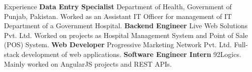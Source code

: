 \begin{rubric}{Experience}
\entry*[2017.10 -- 2018.08]%
	\textbf{Data Entry Specialist} Department of Health, Government of Punjab, Pakistan. Worked as an Assistant IT Officer for management of IT Department of a Government Hospital.
\entry*[2017.05 -- 2017.10]%
	\textbf{Backend Engineer} Live Web Solutions Pvt. Ltd. Worked on projects as Hospital Management System and Point of Sale (POS) System.
\entry*[2016.10 -- 2017.04]%
	\textbf{Web Developer} Progressive Marketing Network Pvt. Ltd. Full-stack development of web applications.
\entry*[2016.06 -- 2016.09]%
	\textbf{Software Engineer Intern} 92Logics. Mainly worked on AngularJS projects and REST APIs.
%
%

\end{rubric}    